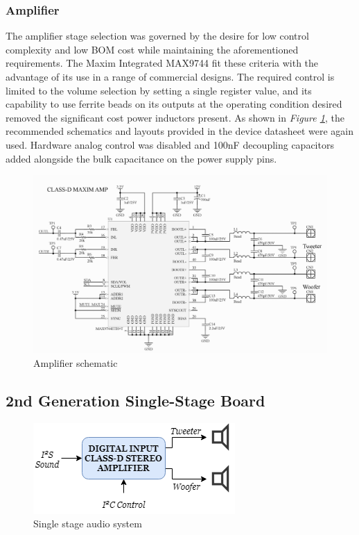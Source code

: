 \documentclass[main.tex]{subfiles}
\begin{document}
\subsubsection{Amplifier}
The amplifier stage selection was governed by the desire for low control complexity and low BOM cost while maintaining the aforementioned requirements. The Maxim Integrated MAX9744 fit these criteria with the advantage of its use in a range of commercial designs. The required control is limited to the volume selection by setting a single register value, and its capability to use ferrite beads on its outputs at the operating condition desired removed the significant cost power inductors present. As shown in \textit{Figure \ref{fig:maxim-circuit}}, the recommended schematics and layouts provided in the device datasheet were again used. Hardware analog control was disabled and 100nF decoupling capacitors added alongside the bulk capacitance on the power supply pins.

\begin{figure}[H]
    \centering
    \includegraphics[scale=0.6]{./figs/MAXIM-circuit.PNG}
    \caption{Amplifier schematic}
    \label{fig:maxim-circuit}
\end{figure}

\subsection{2nd Generation Single-Stage Board}

\begin{figure}[H]
    \centering
    \includegraphics[scale=0.75]{./figs/TAS-system.png}
    \caption{Single stage audio system}
    \label{fig:tas-system}
\end{figure}
\end{document}
